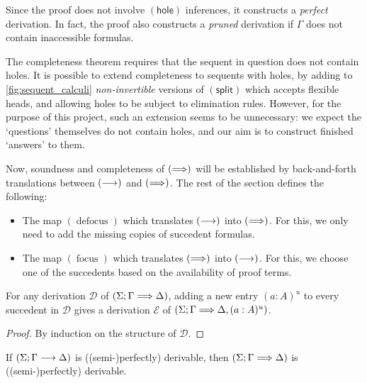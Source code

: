 \documentclass[twoside]{report}
\begin{document}
Since the proof does not involve $(\mathsf{hole})$ inferences, it constructs a \emph{perfect} derivation. In fact, the proof also constructs a \emph{pruned} derivation if $\Gamma$ does not contain inaccessible formulas.

The completeness theorem requires that the sequent in question does not contain holes. It is possible to extend completeness to sequents with holes, by adding to \cref{fig:sequent_calculi} \emph{non-invertible} versions of $(\mathsf{split})$ which accepts flexible heads, and allowing holes to be subject to elimination rules. However, for the purpose of this project, such an extension seems to be unnecessary: we expect the `questions' themselves do not contain holes, and our aim is to construct finished `answers' to them.

\newcommand{\focus}{\operatorname{focus}}
\newcommand{\defocus}{\operatorname{defocus}}
\def\proofSkipAmount{\vskip 0.1em}

Now, soundness and completeness of $(\Longrightarrow)$ will be established by back-and-forth translations between $(\longrightarrow)$ and $(\Longrightarrow)$. The rest of the section defines the following:

\begin{itemize}
    \item The map $(\defocus)$ which translates $(\longrightarrow)$ into $(\Longrightarrow)$. For this, we only need to add the missing copies of succedent formulas.

    \item The map $(\focus)$ which translates $(\Longrightarrow)$ into $(\longrightarrow)$. For this, we choose one of the succedents based on the availability of proof terms.
\end{itemize}

\begin{proposition}
\label{thm:defocusing_lemma}
For any derivation $\mathcal D$ of $(\Sigma; \Gamma \Longrightarrow \Delta)$, adding a new entry $(a : A)^u$ to every succedent in $\mathcal D$ gives a derivation $\mathcal E$ of $(\Sigma; \Gamma \Longrightarrow \Delta, (a : A)^u)$.
\end{proposition}

\begin{proof}
By induction on the structure of $\mathcal D$.
\end{proof}

\begin{proposition}[Defocusing]
\label{thm:defocusing}
If $(\Sigma; \Gamma \longrightarrow \Delta)$ is ((semi-)perfectly) derivable, then $(\Sigma; \Gamma \Longrightarrow \Delta)$ is ((semi-)perfectly) derivable.
\end{proposition}
\end{document}
